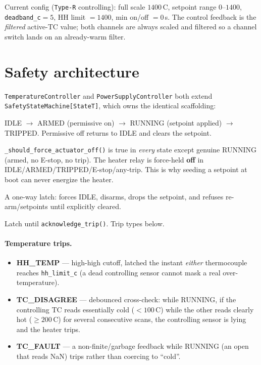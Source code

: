 \documentclass[11pt]{article}
\newcommand{\code}[1]{\texttt{#1}}
\begin{document}
\noindent Current config (\code{Type-R} controlling): full scale $1400$\,\textdegree C,
setpoint range $0$--$1400$, \code{deadband\_c}$=5$, HH limit $=1400$,
min on/off $=0$\,s. The control feedback is the \emph{filtered} active-TC value;
both channels are always scaled and filtered so a channel switch lands on an
already-warm filter.

\section{Safety architecture}\label{sec:safety}
\code{TemperatureController} and \code{PowerSupplyController} both extend
\code{SafetyStateMachine[StateT]}, which owns the identical scaffolding:

\begin{description}[nosep,leftmargin=1.4cm,style=nextline]
  \item[States] IDLE $\rightarrow$ ARMED (permissive on) $\rightarrow$ RUNNING
  (setpoint applied) $\rightarrow$ TRIPPED. Permissive off returns to IDLE and
  clears the setpoint.
  \item[Force-off invariant] \code{\_should\_force\_actuator\_off()} is true in
  \emph{every} state except genuine RUNNING (armed, no E-stop, no trip). The
  heater relay is force-held \textbf{off} in IDLE/ARMED/TRIPPED/E-stop/any-trip.
  This is why seeding a setpoint at boot can never energize the heater.
  \item[E-stop] A one-way latch: forces IDLE, disarms, drops the setpoint, and
  refuses re-arm/setpoints until explicitly cleared.
  \item[Trips] Latch until \code{acknowledge\_trip()}. Trip types below.
\end{description}

\paragraph{Temperature trips.}
\begin{itemize}[nosep]
  \item \textbf{HH\_TEMP} --- high-high cutoff, latched the instant \emph{either}
  thermocouple reaches \code{hh\_limit\_c} (a dead controlling sensor cannot mask
  a real over-temperature).
  \item \textbf{TC\_DISAGREE} --- debounced cross-check: while RUNNING, if the
  controlling TC reads essentially cold ($<100$\,\textdegree C) while the other
  reads clearly hot ($\ge 200$\,\textdegree C) for several consecutive scans, the
  controlling sensor is lying and the heater trips.
  \item \textbf{TC\_FAULT} --- a non-finite/garbage feedback while RUNNING (an open
  that reads NaN) trips rather than coercing to ``cold''.
\end{itemize}
\end{document}
